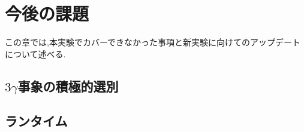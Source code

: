 \chapter{今後の課題}\label{prospect}

この章では,本実験でカバーできなかった事項と新実験に向けてのアップデートについて述べる.

\section{$3\gamma$事象の積極的選別}

\section{ランタイム}



